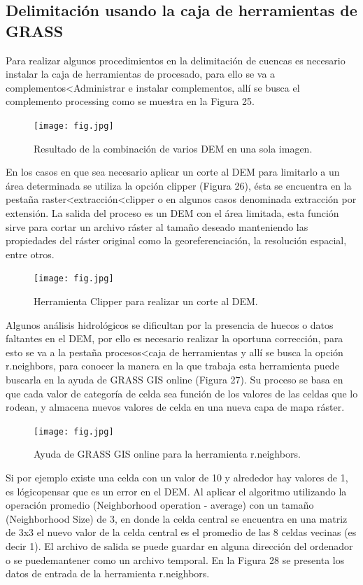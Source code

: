 \documentclass[12pt,hidelinks]{article}
\begin{document}
\subsection{Delimitación usando la caja de herramientas de GRASS}
Para realizar algunos procedimientos en la delimitación de cuencas es necesario instalar la caja de herramientas de procesado, para ello se va a complementos<Administrar e instalar complementos, allí se busca el complemento processing como se muestra en la Figura 25.
\begin{figure}[H]
    \centering
    \texttt{[image: fig.jpg]}
    \caption{Resultado de la combinación de varios DEM en una sola imagen.}
    \label{fig:my_label}
\end{figure}
En los casos en que sea necesario aplicar un corte al DEM para limitarlo a un área determinada se utiliza la opción clipper (Figura 26), ésta se encuentra en la pestaña raster<extracción<clipper o en algunos casos denominada extracción por extensión. La salida del proceso es un DEM con el área limitada, esta función sirve para cortar un archivo ráster al tamaño deseado manteniendo las propiedades del ráster original como la georeferenciación, la resolución espacial, entre otros.
\begin{figure}[H]
    \centering
    \texttt{[image: fig.jpg]}
    \caption{ Herramienta Clipper para realizar un corte al DEM.}
    \label{fig:my_label}
\end{figure}
Algunos análisis hidrológicos se dificultan por la presencia de huecos o datos faltantes en el DEM, por ello es necesario realizar la oportuna corrección, para esto se va a la pestaña procesos<caja de herramientas y allí se busca la opción r.neighbors, para conocer la manera en la que trabaja esta herramienta puede buscarla en la ayuda de GRASS GIS online (Figura 27). Su proceso se basa en que cada valor de categoría de celda sea función de los valores de las celdas que lo rodean, y almacena nuevos valores de celda en una nueva capa de mapa ráster.
\begin{figure}[H]
    \centering
    \texttt{[image: fig.jpg]}
    \caption{Ayuda de GRASS GIS online para la herramienta r.neighbors.}
    \label{fig:my_label}
\end{figure}
Si por ejemplo existe una celda con un valor de 10 y alrededor hay valores de 1, es lógicopensar que es un error en el DEM. Al aplicar el algoritmo utilizando la operación promedio (Neighborhood operation - average) con un tamaño (Neighborhood Size) de 3, en donde la celda central se encuentra en una matriz de 3x3 el nuevo valor de la celda central es el promedio de las 8 celdas vecinas (es decir 1). El archivo de salida se puede guardar en alguna dirección del ordenador o se puedemantener como un archivo temporal. En la Figura 28 se presenta los datos de entrada de la herramienta r.neighbors.
\end{document}
